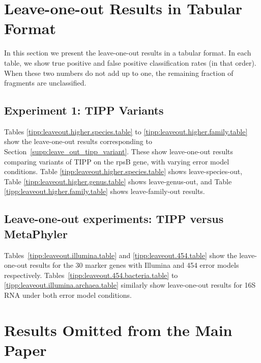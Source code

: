 \newpage
\section{Leave-one-out Results in Tabular Format}
In this section we present the leave-one-out results in a tabular format. 
In each table, we show true positive and false positive classification rates (in that order). 
When these two numbers do not add up to one, the remaining fraction of fragments are unclassified. 


\subsection{Experiment 1: TIPP Variants} 
Tables \ref{tipp:leaveout.higher.species.table} to \ref{tipp:leaveout.higher.family.table} show the
leave-one-out results corresponding to Section~\ref{supp:leave_out_tipp_variant}. These show leave-one-out
results comparing variants of TIPP on the rpsB gene, with varying error model conditions. 
Table \ref{tipp:leaveout.higher.species.table} shows leave-species-out,
Table \ref{tipp:leaveout.higher.genus.table} shows leave-genus-out,
and Table \ref{tipp:leaveout.higher.family.table} shows leave-family-out results.





\subsection{Leave-one-out experiments: TIPP versus MetaPhyler} 
Tables~\ref{tipp:leaveout.illumina.table} and \ref{tipp:leaveout.454.table} show the
leave-one-out results for the 30 marker genes with Illumina and 454 error models respectively. 
Tables~\ref{tipp:leaveout.454.bacteria.table} to \ref{tipp:leaveout.illumina.archaea.table} similarly
show leave-one-out results for 16S RNA under both error model conditions. 
 







\newpage
\section{Results Omitted from the Main Paper}
